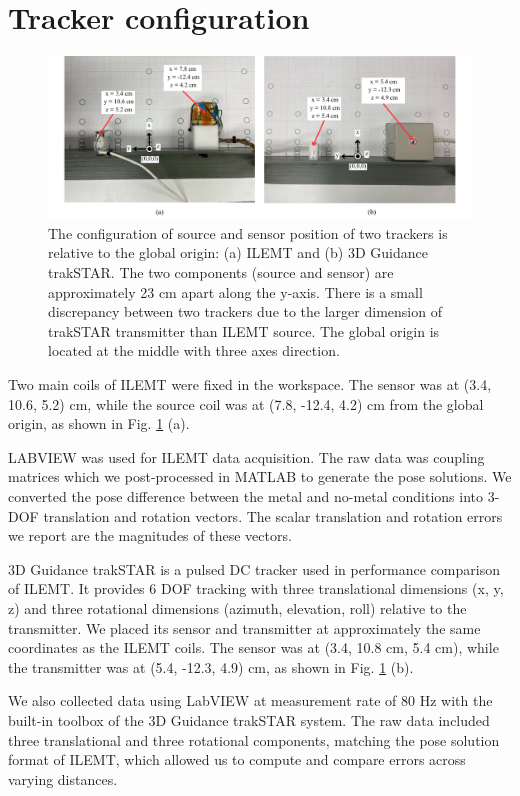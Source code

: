 \documentclass{article}
\begin{document}
\section{Tracker configuration}
\label{supplement:tracker_configuration}
\begin{figure}[H]
\centerline{\includegraphics[width= 7in]{chaicS1.png}}
\caption{The configuration of source and sensor position of two trackers is relative to the global origin: (a) ILEMT and (b) 3D Guidance trakSTAR. The two components (source and sensor) are approximately 23 cm apart along the y-axis. There is a small discrepancy between two trackers due to the larger dimension of trakSTAR transmitter than ILEMT source. The global origin is located at the middle with three axes direction.}
\label{configuration}
\end{figure}

Two main coils of ILEMT were fixed in the workspace. The sensor was at (3.4, 10.6, 5.2) cm, while the source coil was at (7.8, -12.4, 4.2) cm from the global origin, as shown in Fig. \ref{configuration} (a).

LABVIEW was used for ILEMT data acquisition. The raw data was coupling matrices which we post-processed in MATLAB to generate the pose solutions. We converted the pose difference between the metal and no-metal conditions into 3-DOF translation and rotation vectors. The scalar translation and rotation errors we report are the magnitudes of these vectors.

3D Guidance trakSTAR is a pulsed DC tracker used in performance comparison of ILEMT. It provides 6 DOF tracking with three translational dimensions (x, y, z) and three rotational dimensions (azimuth, elevation, roll) relative to the transmitter. We placed its sensor and transmitter at approximately the same coordinates as the ILEMT coils. The sensor was at (3.4, 10.8 cm, 5.4 cm), while the transmitter was at (5.4, -12.3, 4.9) cm, as shown in Fig. \ref{configuration} (b).

We also collected data using LabVIEW at measurement rate of 80 Hz with the built-in toolbox of the 3D Guidance trakSTAR system. The raw data included three translational and three rotational components, matching the pose solution format of ILEMT, which allowed us to compute and compare errors across varying distances.
\end{document}
